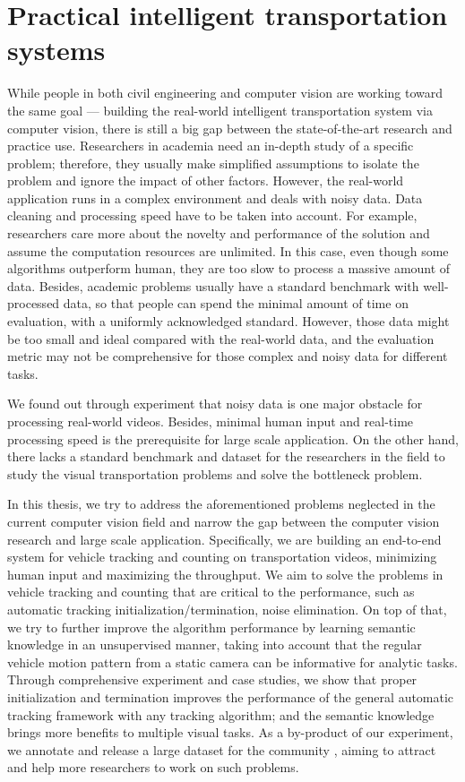 \section{Practical intelligent transportation systems}
\label{sec:intro-cv}

While people in both civil engineering and computer vision are working toward the same goal --- building the real-world intelligent transportation system via computer vision, there is still a big gap between the state-of-the-art research and practice use.
Researchers in academia need an in-depth study of a specific problem; therefore, they usually make simplified assumptions to isolate the problem and ignore the impact of other factors. 
However, the real-world application runs in a complex environment and deals with noisy data. Data cleaning and processing speed have to be taken into account.
For example, researchers care more about the novelty and performance of the solution and assume the computation resources are unlimited. 
In this case, even though some algorithms outperform human, they are too slow to process a massive amount of data. 
Besides, academic problems usually have a standard benchmark with well-processed data, so that people can spend the minimal amount of time on evaluation, with a uniformly acknowledged standard.
However, those data might be too small and ideal compared with the real-world data, and the evaluation metric may not be comprehensive for those complex and noisy data for different tasks.

We found out through experiment that noisy data is one major obstacle for processing real-world videos. 
Besides, minimal human input and real-time processing speed is the prerequisite for large scale application.
On the other hand, there lacks a standard benchmark and dataset for the researchers in the field to study the visual transportation problems and solve the bottleneck problem.

In this thesis, we try to address the aforementioned problems neglected in the current computer vision field and narrow the gap between the computer vision research and large scale application. 
Specifically, we are building an end-to-end system for vehicle tracking and counting on transportation videos, minimizing human input and maximizing the throughput.
We aim to solve the problems in vehicle tracking and counting that are critical to the performance, such as automatic tracking initialization/termination, noise elimination.
On top of that, we try to further improve the algorithm performance by learning semantic knowledge in an unsupervised manner, taking into account that the regular vehicle motion pattern from a static camera can be informative for analytic tasks.
Through comprehensive experiment and case studies, we show that proper initialization and termination improves the performance of the general automatic tracking framework with any tracking algorithm; and the semantic knowledge brings more benefits to multiple visual tasks.
As a by-product of our experiment, we annotate and release a large dataset for the community \cite{yanziVehicleTracker}, aiming to attract and help more researchers to work on such problems.